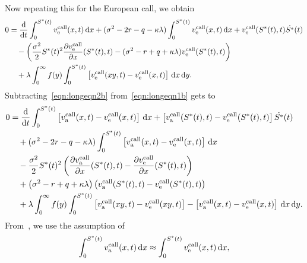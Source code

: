 Now repeating this for the European call, we obtain
		\begin{equation}
        		\label{eqn:longeqn2b}
        		\begin{split}
        		0 &= \frac{\mathrm d}{\mathrm d t}\int_{0}^{S^*(t)} v_{\text{e}}^{\text{call}}(x,t) \, \mathrm d x + (\sigma^2 - 2r - q -\kappa\lambda)\int_{0}^{S^*(t)} v_{\text{e}}^{\text{call}}(x,t) \, \mathrm d x + v_{\text{e}}^{\text{call}}(S^*(t),t)\dot{S^*}(t) \\
        		&\quad{} -\left( \frac{\sigma^2}{2}S^*(t)^2\frac{\partial v_{\text{e}}^{\text{call}}}{\partial x}(S^*(t),t) - (\sigma^2 - r + q + \kappa\lambda)v_{\text{e}}^{\text{call}}(S^*(t),t) \right) \\
        		&\quad{} +\lambda\int_0^\infty f(y) \int_{0}^{S^*(t)} \left[v_{\text{e}}^{\text{call}}(xy,t) - v_{\text{e}}^{\text{call}}(x,t)\right] \, \mathrm d x \, \mathrm d y.
        		\end{split}
        	\end{equation}
Subtracting~\eqref{eqn:longeqn2b} from~\eqref{eqn:longeqn1b} gets to
		\begin{equation}
        		\label{eqn:longeqn3b}
        		\begin{split}
			 0 &= \frac{\mathrm d}{\mathrm d t}\int_0^{S^*(t)} \left[v_{\text{a}}^{\text{call}}(x,t) -  v_{\text{e}}^{\text{call}}(x,t)\right] \, \mathrm d x + \left[ v_{\text{a}}^{\text{call}}(S^*(t),t) -  v_{\text{e}}^{\text{call}}(S^*(t),t) \right]\dot{S^*}(t)\\
			&\quad{} + (\sigma^2 - 2r -q -\kappa\lambda)\int_0^{S^*(t)} \left[v_{\text{a}}^{\text{call}}(x,t) -  v_{\text{e}}^{\text{call}}(x,t)\right] \, \mathrm d x  \\
        		&\quad{} -\frac{\sigma^2}{2}S^*(t)^2 \left( \frac{\partial v_{\text{a}}^{\text{call}}}{\partial x}(S^*(t),t) - \frac{\partial  v_{\text{e}}^{\text{call}}}{\partial x}(S^*(t),t) \right) \\
        		&\quad{} + \left(\sigma^2 - r + q + \kappa\lambda\right)\left(v_{\text{a}}^{\text{call}}(S^*(t),t)- v_{\text{e}}^{\text{call}}(S^*(t),t) \right) \\
        		&\quad{} +\lambda\int_0^\infty f(y) \int_0^{S^*(t)} \left[ v_{\text{a}}^{\text{call}}(xy,t) -  v_{\text{e}}^{\text{call}}(xy,t) \right] - \left[ v_{\text{a}}^{\text{call}}(x,t) -  v_{\text{e}}^{\text{call}}(x,t)\right] \, \mathrm d x \, \mathrm d y.
			\end{split}
		\end{equation}
From~\cite{Rodrigo2013}, we use the assumption of 
		\begin{equation}
				\label{eqn:assump2}
				\int_0^{S^*(t)} v_{\text{a}}^{\text{call}}(x,t) \, \mathrm d x \approx \int_0^{S^*(t)}  v_{\text{e}}^{\text{call}}(x,t) \, \mathrm d x,
			\end{equation}
